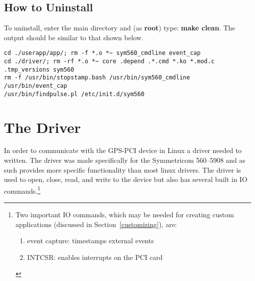 \documentclass[11pt]{article}
\begin{document}
    \subsection{How to Uninstall} \label{subsec:uninstall}
    To uninstall, enter the main directory and (as \textbf{root}) type: \textbf{make clean}.
    The output should be similar to that shown below.
    \begin{footnotesize}
        \begin{verbatim}
cd ./userapp/app/; rm -f *.o *~ sym560_cmdline event_cap
cd ./driver/; rm -rf *.o *~ core .depend .*.cmd *.ko *.mod.c .tmp_versions sym560
rm -f /usr/bin/stopstamp.bash /usr/bin/sym560_cmdline /usr/bin/event_cap 
/usr/bin/findpulse.pl /etc/init.d/sym560
        \end{verbatim}
    \end{footnotesize}




    \section{The Driver} \label{sec:driver}

    In order to communicate with the GPS-PCI device in Linux a driver needed to written.
    The driver was made specifically for the Symmetricom 560--5908 and as such provides more specific functionality than most linux drivers. The driver is used to open, close, read, and write to the device but also has several built in IO commands.\footnote{Two important IO commands, which may be needed for creating custom applications (discussed in Section~\ref{customizing}), are:
        \begin{enumerate}
            \item event capture: timestamps external events
            \item INTCSR: enables interrupts on the PCI card
        \end{enumerate}
    }
\end{document}
